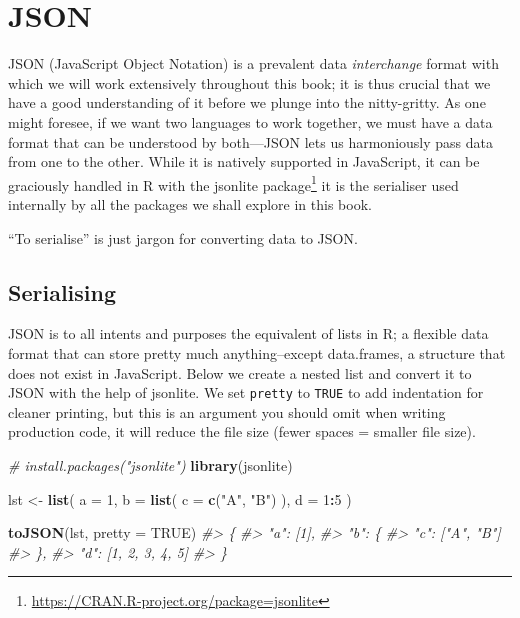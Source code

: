 \documentclass[
  10pt,
]{krantz}
\makeatletter
\newenvironment{Shaded}{\begin{snugshade}}{\end{snugshade}}
\newcommand{\CommentTok}[1]{\textcolor[rgb]{0.37,0.37,0.37}{\textit{#1}}}
\newcommand{\DataTypeTok}[1]{\textcolor[rgb]{0.27,0.27,0.27}{#1}}
\newcommand{\DecValTok}[1]{\textcolor[rgb]{0.06,0.06,0.06}{#1}}
\newcommand{\KeywordTok}[1]{\textcolor[rgb]{0.27,0.27,0.27}{\textbf{#1}}}
\newcommand{\NormalTok}[1]{#1}
\newcommand{\OperatorTok}[1]{\textcolor[rgb]{0.43,0.43,0.43}{\textbf{#1}}}
\newcommand{\OtherTok}[1]{\textcolor[rgb]{0.37,0.37,0.37}{#1}}
\newcommand{\StringTok}[1]{\textcolor[rgb]{0.5,0.5,0.5}{#1}}
\renewcommand{\href}[2]{#2\footnote{\url{#1}}}
\newenvironment{kframe}{%
\medskip{}
\setlength{\fboxsep}{.8em}
 \def\at@end@of@kframe{}%
 \ifinner\ifhmode%
  \def\at@end@of@kframe{\end{minipage}}%
  \begin{minipage}{\columnwidth}%
 \fi\fi%
 \def\FrameCommand##1{\hskip\@totalleftmargin \hskip-\fboxsep
 \colorbox{shadecolor}{##1}\hskip-\fboxsep
     \hskip-\linewidth \hskip-\@totalleftmargin \hskip\columnwidth}%
 \MakeFramed {\advance\hsize-\width
   \@totalleftmargin\z@ \linewidth\hsize
   \@setminipage}}%
 {\par\unskip\endMakeFramed%
 \at@end@of@kframe}
\renewenvironment{Shaded}{\begin{kframe}}{\end{kframe}}
\newenvironment{rmdblock}[1]
  {
  \begin{itemize}
  \renewcommand{\labelitemi}{
    \raisebox{-.7\height}[0pt][0pt]{
      {\setkeys{Gin}{width=3em,keepaspectratio}\texttt{[image: images/\#1]}}
    }
  }
  \setlength{\fboxsep}{1em}
  \begin{kframe}
  \item
  }
  {
  \end{kframe}
  \end{itemize}
  }
\newenvironment{rmdnote}
  {\begin{rmdblock}{note}}
  {\end{rmdblock}}
\makeatother
\begin{document}
\hypertarget{basics-json}{%
\section{JSON}\label{basics-json}}

JSON (JavaScript Object Notation) is a prevalent data \emph{interchange} format with which we will work extensively throughout this book; it is thus crucial that we have a good understanding of it before we plunge into the nitty-gritty. As one might foresee, if we want two languages to work together, we must have a data format that can be understood by both---JSON lets us harmoniously pass data from one to the other. While it is natively supported in JavaScript, it can be graciously handled in R with the \href{https://CRAN.R-project.org/package=jsonlite}{jsonlite package} \citep{R-jsonlite} it is the serialiser used internally by all the packages we shall explore in this book.

\begin{rmdnote}
``To serialise'' is just jargon for converting data to JSON.
\end{rmdnote}

\hypertarget{serialising}{%
\subsection{Serialising}\label{serialising}}

JSON is to all intents and purposes the equivalent of lists in R; a flexible data format that can store pretty much anything--except data.frames, a structure that does not exist in JavaScript. Below we create a nested list and convert it to JSON with the help of jsonlite. We set \texttt{pretty} to \texttt{TRUE} to add indentation for cleaner printing, but this is an argument you should omit when writing production code, it will reduce the file size (fewer spaces = smaller file size).

\begin{Shaded}
\begin{Highlighting}[]
\CommentTok{\# install.packages("jsonlite")}
\KeywordTok{library}\NormalTok{(jsonlite)}

\NormalTok{lst <{-}}\StringTok{ }\KeywordTok{list}\NormalTok{(}
  \DataTypeTok{a =} \DecValTok{1}\NormalTok{,}
  \DataTypeTok{b =} \KeywordTok{list}\NormalTok{(}
    \DataTypeTok{c =} \KeywordTok{c}\NormalTok{(}\StringTok{"A"}\NormalTok{, }\StringTok{"B"}\NormalTok{)}
\NormalTok{  ),}
  \DataTypeTok{d =} \DecValTok{1}\OperatorTok{:}\DecValTok{5}
\NormalTok{)}

\KeywordTok{toJSON}\NormalTok{(lst, }\DataTypeTok{pretty =} \OtherTok{TRUE}\NormalTok{)}
\CommentTok{\#> \{}
\CommentTok{\#>   "a": [1],}
\CommentTok{\#>   "b": \{}
\CommentTok{\#>     "c": ["A", "B"]}
\CommentTok{\#>   \},}
\CommentTok{\#>   "d": [1, 2, 3, 4, 5]}
\CommentTok{\#> \}}
\end{Highlighting}
\end{Shaded}
\end{document}
